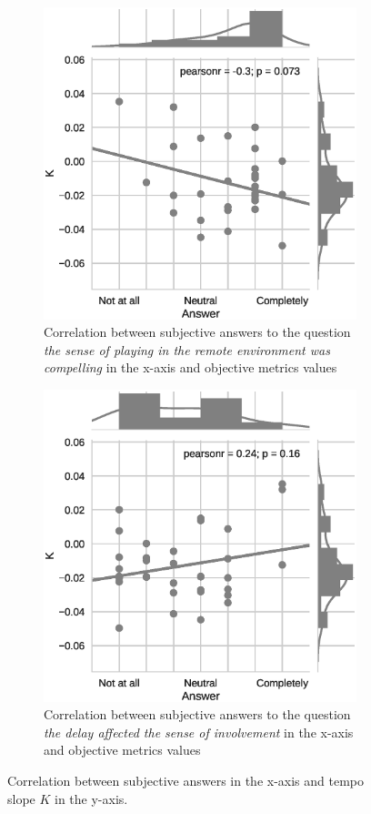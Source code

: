 
\begin{figure}[t]
	\centering
	\begin{subfigure}[t]{.49\textwidth}
		\centering        
		\includegraphics[trim={0cm 0cm 1cm 0cm},clip,width=.8\textwidth]{img/compelling}
		\caption{Correlation between subjective answers to the question \textit{the sense of playing in the remote environment was compelling} in the x-axis and objective metrics values}
		\label{subfig:compelling}
	\end{subfigure}
	\quad
	\begin{subfigure}[t]{.43\textwidth}
		\centering        
		\includegraphics[trim={3cm 0cm 0cm 0cm},clip,width=.8\textwidth]{img/involvement}
		\caption{Correlation between subjective answers to the question \textit{the delay affected the sense of involvement} in the x-axis and objective metrics values}
		\label{subfig:involvement}
	\end{subfigure}
	\quad 
	\caption{Correlation between subjective answers in the x-axis and tempo slope $K$ in the y-axis.}\label{fig:ci}
\end{figure}  


